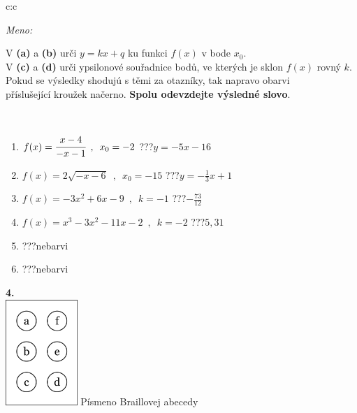 \documentclass[10pt]{report}
\begin{document}
\begin{tabular}{c:c}
\begin{minipage}[c][104.5mm][t]{0.5\linewidth}
\begin{center}
\textit{Meno:}\phantom{xxxxxxxxxxxxxxxxxxxxxxxxxxxxxxxxxxxxxxxxxxxxxxxxxxxxxxxxxxxxxxxxx}\\[5mm]
\begin{minipage}{0.95\linewidth}
\begin{center}
V \textbf{(a)} a \textbf{(b)} urči  $y = kx + q$ ku funkci $f(x)$ v bode $x_0$.\\V \textbf{(c)} a \textbf{(d)} urči ypsilonové souřadnice bodů, ve kterých je sklon $f(x)$ rovný $k$.\\Pokud se výsledky shodujú s těmi za otazníky, tak napravo obarvi\\příslušející kroužek načerno. \textbf{Spolu odevzdejte výsledné slovo}.
\end{center}
\end{minipage}
\\[1mm]
\begin{minipage}{0.79\linewidth}
\begin{center}
\begin{varwidth}{\linewidth}
\begin{enumerate}
\small
\item $f(x)=\cfrac{x-4}{-x-1}\enspace , \enspace x_0=-2$\quad \dotfill\; ???\;\dotfill \quad $y = -5x-16$
\item $f(x)=2\sqrt{-x-6}\enspace , \enspace x_0=-15$\quad \dotfill\; ???\;\dotfill \quad $y = -\frac{1}{3}x+1$
\item $f(x)=-3x^2+6x-9\enspace , \enspace k=-1$\quad \dotfill\; ???\;\dotfill \quad $-\frac{73}{12}$
\item $f(x)=x^3-3x^2-11x-2\enspace , \enspace k=-2$\quad \dotfill\; ???\;\dotfill \quad $5 , 31$
\item \quad \dotfill\; ???\;\dotfill \quad nebarvi
\item \quad \dotfill\; ???\;\dotfill \quad nebarvi
\end{enumerate}
\end{varwidth}
\end{center}
\end{minipage}
\begin{minipage}{0.20\linewidth}
\begin{center}
{\Huge\bfseries 4.} \\[2mm]
\includegraphics[height=40mm]{../images/braille.png}
{\small Písmeno Braillovej abecedy}
\end{center}
\end{minipage}
\end{center}
\end{minipage}
%
\end{tabular}
\end{document}

